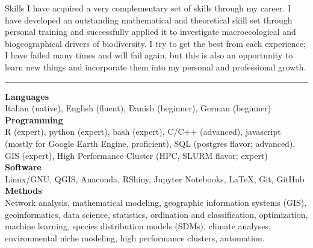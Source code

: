 \documentclass{resume} %
\newcommand{\spazio}{\begin{center} \par\noindent\rule{0.2\textwidth}{0.4pt} \end{center}}
\begin{document}
\begin{rSection}{Skills}
I have acquired a very complementary set of skills through my career.
I have developed an outstanding mathematical and theoretical skill set through personal training and successfully applied it to investigate macroecological and biogeographical drivers of biodiversity.
I try to get the best from each experience; I have failed many times and will fail again, but this is also an opportunity to learn new things and incorporate them into my personal and professional growth.

\spazio

{\bf Languages}\\
Italian (native), English (fluent), Danish (beginner), German (beginner)\\
{\bf Programming}\\
R (expert), python (expert), bash (expert), C/C++ (advanced), javascript (mostly for Google Earth Engine, proficient), SQL (postgres flavor; advanced), GIS (expert), High Performance Cluster (HPC, SLURM flavor; expert)\\
{\bf Software} \\
Linux/GNU, QGIS, Anaconda, RShiny, Jupyter Notebooks, \LaTeX, Git, GitHub\\
{\bf Methods} \\
Network analysis,
mathematical modeling,
geographic information systems (GIS),
geoinformatics,
data science,
statistics,
ordination and classification,
optimization,
machine learning,
species distribution models (SDMs),
climate analyses,
environmental niche modeling,
high performance clusters, 
automation.
\end{rSection}
\end{document}
